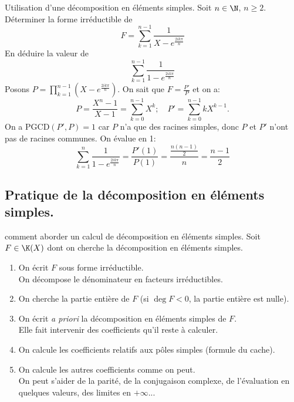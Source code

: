 \documentclass[11pt]{article}
\begin{document}
\begin{ex}{Utilisation d'une décomposition en éléments simples.}{}
    Soit $n\in\N$, $n\geq2$. Déterminer la forme irréductible de
    \begin{equation*}
        F=\sum_{k=1}^{n-1}\frac{1}{X-e^{\frac{2ik\pi}{n}}}
    \end{equation*}
    En déduire la valeur de
    \begin{equation*}
        \sum_{k=1}^{n-1}\frac{1}{1-e^{\frac{2ik\pi}{n}}}
    \end{equation*}
    \tcblower
    Posons $P=\prod\limits_{k=1}^{n-1}(X-e^{\frac{2ik\pi}{n}})$. On sait que $F=\frac{P'}{P}$ et on a:
    \begin{equation*}
        P=\frac{X^n-1}{X-1}=\sum_{k=0}^{n-1}X^k; \quad P'=\sum_{k=0}^{n-1}kX^{k-1}.
    \end{equation*}
    On a PGCD$(P',P)=1$ car $P$ n'a que des racines simples, donc $P$ et $P'$ n'ont pas de racines communes.\n
    On évalue en 1:
    \begin{equation*}
        \sum_{k=1}^n\frac{1}{1-e^{\frac{2ik\pi}{n}}}=\frac{P'(1)}{P(1)}=\frac{\frac{n(n-1)}{2}}{n}=\frac{n-1}{2}
    \end{equation*}
\end{ex}

\subsection{Pratique de la décomposition en éléments simples.}

\begin{meth}{comment aborder un calcul de décomposition en éléments simples.}{}
    Soit $F\in\K(X)$ dont on cherche la décomposition en éléments simples.
    \begin{enumerate}[topsep=0pt,itemsep=-0.9 ex]
        \item On écrit $F$ sous forme irréductible.\\On décompose le dénominateur en facteurs irréductibles.
        \item On cherche la partie entière de $F$ (si $\deg F < 0$, la partie entière est nulle).
        \item On écrit \emph{a priori} la décomposition en éléments simples de $F$.\\Elle fait intervenir des coefficients qu'il reste à calculer.
        \item On calcule les coefficients relatifs aux pôles simples (formule du cache).
        \item On calcule les autres coefficients comme on peut.\\On peut s'aider de la parité, de la conjugaison complexe, de l'évaluation en quelques valeurs, des limites en $+\infty$...
    \end{enumerate}
\end{meth}
\end{document}
